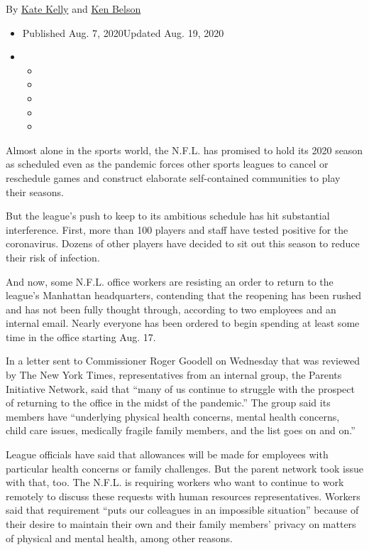 By \href{https://www.nytimes3xbfgragh.onion/by/kate-kelly}{Kate Kelly}
and \href{https://www.nytimes3xbfgragh.onion/by/ken-belson}{Ken Belson}

\begin{itemize}
\item
  Published Aug. 7, 2020Updated Aug. 19, 2020
\item
  \begin{itemize}
  \item
  \item
  \item
  \item
  \item
  \end{itemize}
\end{itemize}

Almost alone in the sports world, the N.F.L. has promised to hold its
2020 season as scheduled even as the pandemic forces other sports
leagues to cancel or reschedule games and construct elaborate
self-contained communities to play their seasons.

But the league's push to keep to its ambitious schedule has hit
substantial interference. First, more than 100 players and staff have
tested positive for the coronavirus. Dozens of other players have
decided to sit out this season to reduce their risk of infection.

And now, some N.F.L. office workers are resisting an order to return to
the league's Manhattan headquarters, contending that the reopening has
been rushed and has not been fully thought through, according to two
employees and an internal email. Nearly everyone has been ordered to
begin spending at least some time in the office starting Aug. 17.

In a letter sent to Commissioner Roger Goodell on Wednesday that was
reviewed by The New York Times, representatives from an internal group,
the Parents Initiative Network, said that ``many of us continue to
struggle with the prospect of returning to the office in the midst of
the pandemic.'' The group said its members have ``underlying physical
health concerns, mental health concerns, child care issues, medically
fragile family members, and the list goes on and on.''

League officials have said that allowances will be made for employees
with particular health concerns or family challenges. But the parent
network took issue with that, too. The N.F.L. is requiring workers who
want to continue to work remotely to discuss these requests with human
resources representatives. Workers said that requirement ``puts our
colleagues in an impossible situation'' because of their desire to
maintain their own and their family members' privacy on matters of
physical and mental health, among other reasons.

